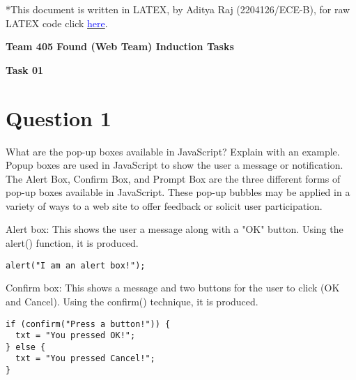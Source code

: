 \documentclass{article}
\begin{document}
*This document is written in LATEX, by Aditya Raj (2204126/ECE-B), for raw LATEX code click \href{https://www.example.com/}{\textcolor{blue}{here}}.
\begin{center}
\textbf{\Large Team 405 Found (Web Team) Induction Tasks}
\end{center}
\hspace{0.54cm}\textbf{\Large Task 01}

\section*{Question 1}
What are the pop-up boxes available in JavaScript? Explain with an example.\vspace{3\baselineskip}
Popup boxes are used in JavaScript to show the user a message or notification. The Alert Box, Confirm Box, and Prompt Box are the three different forms of pop-up boxes available in JavaScript. These pop-up bubbles may be applied in a variety of ways to a web site to offer feedback or solicit user participation.\vspace{2\baselineskip}

Alert box: This shows the user a message along with a "OK" button. Using the alert() function, it is produced.

\begin{lstlisting}[caption=Alert Box Snippet]
alert("I am an alert box!");
\end{lstlisting}

Confirm box: This shows a message and two buttons for the user to click (OK and Cancel). Using the confirm() technique, it is produced.

\begin{lstlisting}[caption=Confirm Box Snippet]
if (confirm("Press a button!")) {
  txt = "You pressed OK!";
} else {
  txt = "You pressed Cancel!";
}
\end{lstlisting}
\end{document}
